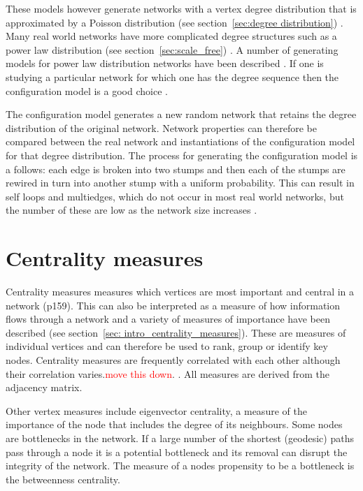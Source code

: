These models however generate networks with a vertex degree distribution that is approximated by  a Poisson distribution (see section~\ref{sec:degree distribution}) . Many real world networks have more complicated degree structures such as a power law distribution (see section~\ref{sec:scale_free}) . A number of generating models for power law distribution networks have been described . If one is studying a particular network for which one has the degree sequence then the configuration model is a good choice . \cite{newman2018networks}

The configuration model generates a new random network that retains the degree distribution of the original network. Network properties can therefore be compared between the real network and instantiations of the configuration model for that degree distribution. The process for generating the configuration model is a follows: each edge is broken into two stumps and then each of the stumps are rewired in turn into another stump with a uniform probability. This can result in self loops and multiedges, which do not occur in most real world networks, but the number of these are low as the network size increases \cite{newman2018networks}.




\section{Centrality measures}
\label{sec:centrality measures}
Centrality measures measures which vertices are most important and central in a network \cite{newman2018networks}(p159). This can also be interpreted as a measure of how information flows through a network \cite{borgatti2005centrality} and a variety of measures of importance have been described (see section~\ref{sec: intro_centrality_measures}). These are measures of individual vertices and can therefore be used to rank, group or identify key nodes. Centrality measures are frequently correlated with each other \cite{valente2008correlated} although their correlation varies.\textcolor{red}{move this down}. . All measures are derived from the adjacency matrix.



Other vertex measures include eigenvector centrality, a measure of the importance of the node that includes the degree of its neighbours. \cite{bonacich1987power}  Some nodes are bottlenecks in the network. If a large number of the shortest (geodesic) paths pass through a node it is a potential bottleneck and its removal can disrupt the integrity of the network. The measure of a nodes propensity to be a bottleneck is the betweenness centrality. \cite{freeman1977set} 

